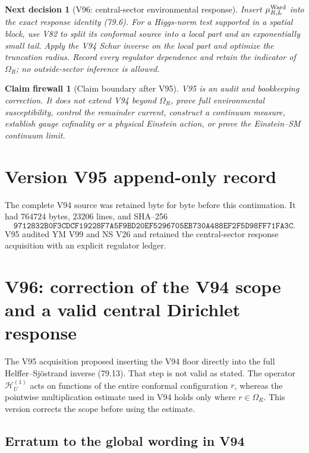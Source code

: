 \documentclass[11pt]{article}
\newtheorem{firewall}[theorem]{Claim firewall}
\newtheorem{decision}[theorem]{Next decision}
\theoremstyle{remark}
\begin{document}
\begin{decision}[V96: central-sector environmental response]
\label{dec:v17v95-next}
Insert \(\mu_{R,L}^{\rm Ward}\) into the exact response identity
(79.6).  For a Higgs-norm test supported in a spatial block, use V82 to
split its conformal source into a local part and an exponentially
small tail.  Apply the V94 Schur inverse on the local part and optimize
the truncation radius.  Record every regulator dependence and retain
the indicator of \(\Omega_R\); no outside-sector inference is allowed.
\end{decision}

\begin{firewall}[Claim boundary after V95]
\label{fire:v17v95}
V95 is an audit and bookkeeping correction.  It does not extend V94
beyond \(\Omega_R\), prove full environmental susceptibility, control
the remainder current, construct a continuum measure, establish gauge
cofinality or a physical Einstein action, or prove the Einstein--SM
continuum limit.
\end{firewall}

\section*{Version V95 append-only record}
The complete V94 source was retained byte for byte before this
continuation.  It had \(764724\) bytes, \(23206\) lines, and SHA--256
\[
 \texttt{9712832B0F3CDCF19228F7A5F9BD20EF5296705EB730A488EF2F5D98FF71FA3C}.
\]
V95 audited YM V99 and NS V26 and retained the central-sector response
acquisition with an explicit regulator ledger.


\section{V96: correction of the V94 scope and a valid central Dirichlet response}
\label{sec:v17v96}

The V95 acquisition proposed inserting the V94 floor directly into the
full Helffer--Sj\"ostrand inverse (79.13).  That step is not valid as
stated.  The operator \(\mathscr H_U^{(1)}\) acts on functions of the
entire conformal configuration \(r\), whereas the pointwise
multiplication estimate used in V94 holds only where
\(r\in\Omega_R\).  This version corrects the scope before using the
estimate.

\subsection{Erratum to the global wording in V94}
\end{document}
